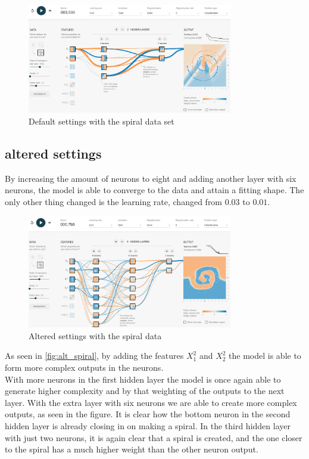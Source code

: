 \documentclass{article}
\begin{document}
\begin{figure}[h]
  \centering
  \includegraphics[width=0.8\textwidth]{default_spiral.png}
  \caption{Default settings with the spiral data set}
  \label{fig:def_spiral}
\end{figure}

\subsection{altered settings}
By increasing the amount of neurons to eight and adding another layer with six neurons, the model is able to converge to the data and attain a fitting shape. The only other thing changed is the learning rate, changed from $0.03$ to $0.01$.

\begin{figure}[h]
  \centering
  \includegraphics[width=0.8\textwidth]{alternated_spiral.png}
  \caption{Altered settings with the spiral data}
  \label{fig:alt_spiral}
\end{figure}

As seen in \autoref{fig:alt_spiral}, by adding the features $X_1^2$ and $X_2^2$ the model is able to form more complex outputs in the neurons.\\
With more neurons in the first hidden layer the model is once again able to generate higher complexity and by that weighting of the outputs to the next layer. With the extra layer with six neurons we are able to create more complex outputs, as seen in the figure. It is clear how the bottom neuron in the second hidden layer is already closing in on making a spiral. In the third hidden layer with just two neurons, it is again clear that a spiral is created, and the one closer to the spiral has a much higher weight than the other neuron output.
\end{document}
